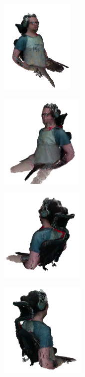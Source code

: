 \begin{figure}[h]
    \centering
    \begin{subfigure}[t]{0.2\textheight}
    	\centering
        \includegraphics[height=4.5cm]{archivos/experimentacion-5-resultado-nube.png}
    \end{subfigure}
    \begin{subfigure}[t]{0.2\textheight}
    	\centering
        \includegraphics[height=4.5cm]{archivos/experimentacion-5-resultado-nube-2.png}
    \end{subfigure}
    \begin{subfigure}[t]{0.2\textheight}
    	\centering
        \includegraphics[height=4.5cm]{archivos/experimentacion-5-resultado-nube-3.png}
    \end{subfigure}
    \begin{subfigure}[t]{0.2\textheight}
    	\centering
        \includegraphics[height=4.5cm]{archivos/experimentacion-5-resultado-nube-4.png}

\end{subfigure}
\end{figure}
